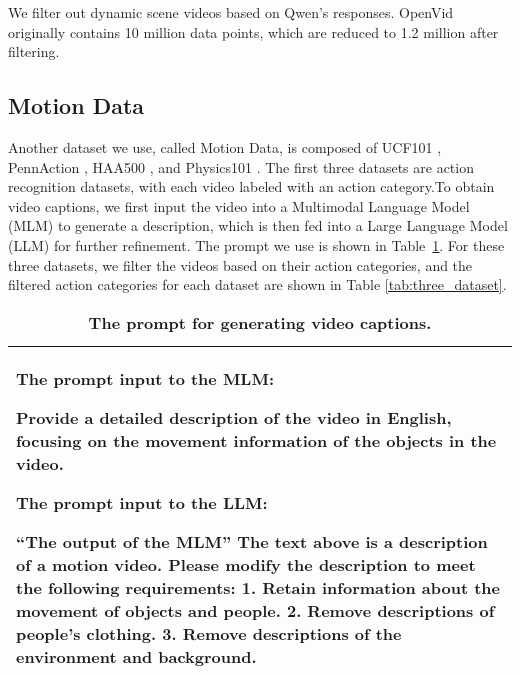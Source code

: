 We filter out dynamic scene videos based on Qwen's responses. OpenVid originally contains 10 million data points, which are reduced to 1.2 million after filtering.

\subsection{Motion Data}

Another dataset we use, called Motion Data, is composed of UCF101 \cite{ucf101}, PennAction \cite{pennaction}, HAA500 \cite{haa500}, and  Physics101 \cite{pennaction}. The first three datasets are action recognition datasets, with each video labeled with an action category.To obtain video captions, we first input the video into a Multimodal Language Model (MLM) to generate a description, which is then fed into a Large Language Model (LLM) for further refinement. The prompt we use is shown in Table~\ref{tab:caption_prompt}. For these three datasets, we filter the videos based on their action categories, and the filtered action categories for each dataset are shown in Table \ref{tab:three_dataset}.

\begin{table}[ht]
\centering
\setlength{\tabcolsep}{0pt}  %
\fontsize{8}{10}\selectfont
\renewcommand{\arraystretch}{1.0}
\begin{tabularx}{\columnwidth}{@{}X@{}}  %
\toprule
\rowcolor{mycolor}
\sloppy
The prompt input to the MLM:\par
Provide a detailed description of the video in English, focusing on the movement information of the objects in the video.\par
The prompt input to the LLM:\par
\textbf{``The output of the MLM''} The text above is a description of a motion video. Please modify the description to meet the following requirements: 1. Retain information about the movement of objects and people. 2. Remove descriptions of people's clothing. 3. Remove descriptions of the environment and background.\par
\\ %
\bottomrule
\end{tabularx}
\caption{\textbf{The prompt for generating video captions.}}
\label{tab:caption_prompt}
\end{table}




